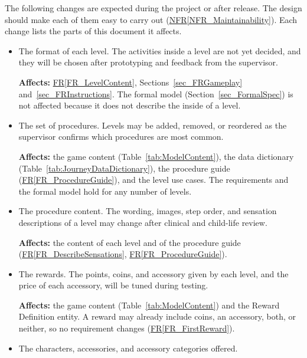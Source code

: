 \documentclass[12pt]{article}
\newcommand{\rref}[1]{\hyperref[#1]{FR\ref*{#1}}}
\newcommand{\nfrref}[1]{\hyperref[#1]{NFR\ref*{#1}}}
\newcounter{lcnum} %
\begin{document}
The following changes are expected during the project or after release. The
design should make each of them easy to carry out
(\nfrref{NFR_Maintainability}). Each change lists the parts of this document
it affects.

\noindent \begin{itemize}

\item[\refstepcounter{lcnum}\textbf{LC\thelcnum}\label{LC_LevelFormat}:]
The format of each level. The activities inside a level are not yet decided,
and they will be chosen after prototyping and feedback from the supervisor.

\textbf{Affects:} \rref{FR_LevelContent},
Sections~\ref{sec_FRGameplay} and~\ref{sec_FRInstructions}. The formal model
(Section~\ref{sec_FormalSpec}) is not affected because it does not describe
the inside of a level.

\item[\refstepcounter{lcnum}\textbf{LC\thelcnum}\label{LC_Procedures}:]
The set of procedures. Levels may be added, removed, or reordered as the
supervisor confirms which procedures are most common.

\textbf{Affects:} the game content (Table~\ref{tab:ModelContent}), the data
dictionary (Table~\ref{tab:JourneyDataDictionary}), the procedure guide
(\rref{FR_ProcedureGuide}), and the level use cases. The requirements and the
formal model hold for any number of levels.

\item[\refstepcounter{lcnum}\textbf{LC\thelcnum}\label{LC_ClinicalContent}:]
The procedure content. The wording, images, step order, and sensation
descriptions of a level may change after clinical and child-life review.

\textbf{Affects:} the content of each level and of the procedure guide
(\rref{FR_DescribeSensations}, \rref{FR_ProcedureGuide}).

\item[\refstepcounter{lcnum}\textbf{LC\thelcnum}\label{LC_Rewards}:]
The rewards. The points, coins, and accessory given by each level, and the
price of each accessory, will be tuned during testing.

\textbf{Affects:} the game content (Table~\ref{tab:ModelContent}) and the
Reward Definition entity. A reward may already include coins, an accessory,
both, or neither, so no requirement changes (\rref{FR_FirstReward}).

\item[\refstepcounter{lcnum}\textbf{LC\thelcnum}\label{LC_Characters}:]
The characters, accessories, and accessory categories offered.


\end{itemize}
\end{document}
